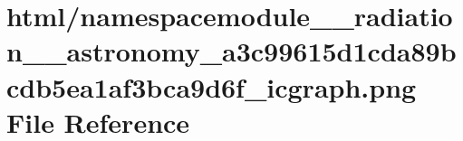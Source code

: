 \hypertarget{namespacemodule____radiation____astronomy__a3c99615d1cda89bcdb5ea1af3bca9d6f__icgraph_8png}{}\section{html/namespacemodule\+\_\+\+\_\+radiation\+\_\+\+\_\+astronomy\+\_\+a3c99615d1cda89bcdb5ea1af3bca9d6f\+\_\+icgraph.png File Reference}
\label{namespacemodule____radiation____astronomy__a3c99615d1cda89bcdb5ea1af3bca9d6f__icgraph_8png}
